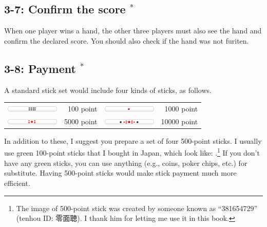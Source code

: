 \subsection*{3-7: Confirm the score $^{*}$}
When one player wins a hand, the other three players must also see the hand and confirm the declared score. You should also check if the hand was not {\jap furiten}. 

\subsection*{3-8: Payment $^{*}$}
A standard stick set would include four kinds of sticks, as follows.

\bigskip
\begin{tabular}{l r l r}
\includegraphics[width=1in]{figs/tenbou100} & 100 point & 
\includegraphics[width=1in]{figs/tenbou1000} & 1000 point \\
\includegraphics[width=1in]{figs/tenbou5000} & 5000 point & 
\includegraphics[width=1in]{figs/tenbou10000} & 10000 point \\
\end{tabular}


\bigskip \noindent
In addition to these, I suggest you prepare a set of four 500-point sticks. I usually use green 100-point sticks that I bought in Japan, which look like: .\footnote{The image of 500-point stick was created by someone known as ``381654729'' ({\jap tenhou} ID: 零面聴). I thank him for letting me use it in this book.} If you don't have any green sticks, you can use anything (e.g., coins, poker chips, etc.) for substitute. 
Having 500-point sticks would make stick payment much more efficient.

